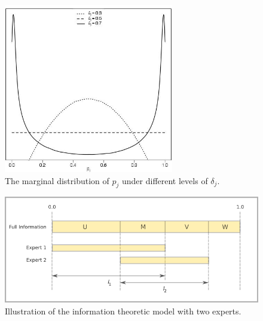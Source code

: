 \documentclass[11pt,twoside]{article}
\begin{document}
\begin{figure}[htbp]
   \centering
   \includegraphics[width = 20em]{Marginals} %
   \caption{The marginal distribution of $p_j$ under different levels of $\delta_j$.}
   \label{marginals}
\end{figure}

\begin{figure}[htbp]
   \includegraphics[width = \textwidth]{N=2} %
   \caption{Illustration of the information theoretic model with two experts.}
   \label{diagram2}
\end{figure}
\end{document}

